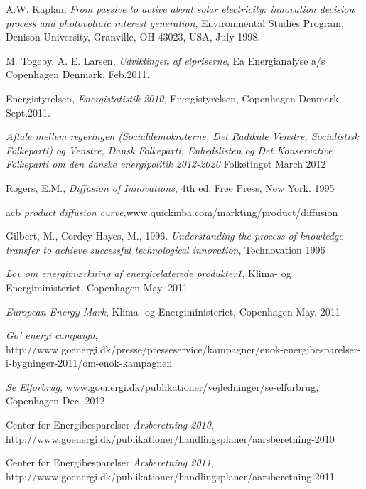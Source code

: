 \documentclass[journal]{IEEEtran}
\begin{document}
\begin{thebibliography}{1}

A.W. Kaplan, \emph{From passive to active about solar electricity: innovation decision
process and photovoltaic interest generation}, \relax Environmental Studies Program, Denison University, Granville, OH 43023, USA, July 1998.

M. Togeby, A. E. Larsen, \emph{Udviklingen af elpriserne}, \relax Ea Energianalyse a/s Copenhagen Denmark, Feb.2011.

Energistyrelsen, \emph{Energistatistik 2010}, \relax Energistyrelsen, Copenhagen Denmark, Sept.2011.

\emph{Aftale mellem regeringen (Socialdemokraterne, Det Radikale Venstre, Socialistisk Folkeparti) og Venstre, Dansk Folkeparti, Enhedslisten og Det Konservative Folkeparti
om den danske energipolitik 2012-2020} \relax Folketinget March 2012

Rogers, E.M., \emph{Diffusion of Innovations}, \relax 4th ed. Free Press, New York. 1995

acb \emph{product diffusion curve},\relax www.quickmba.com/markting/product/diffusion

Gilbert, M., Cordey-Hayes, M., 1996. \emph{Understanding the process of
knowledge transfer to achieve successful technological innovation}, \relax Technovation 1996

\emph{Lov om energimærkning af energirelaterede produkter1}, \relax Klima- og Energiministeriet, Copenhagen May. 2011 

\emph{European Energy Mark}, \relax Klima- og Energiministeriet, Copenhagen May. 2011 

\emph{Go' energi campaign}, \relax http://www.goenergi.dk/presse/presseservice/kampagner/enok-energibesparelser-i-bygninger-2011/om-enok-kampagnen 

\emph{Se Elforbrug}, \relax www.goenergi.dk/publikationer/vejledninger/se-elforbrug, Copenhagen Dec. 2012

Center for Energibesparelser \emph{Årsberetning 2010}, \relax http://www.goenergi.dk/publikationer/handlingsplaner/aarsberetning-2010

Center for Energibesparelser \emph{Årsberetning 2011}, \relax http://www.goenergi.dk/publikationer/handlingsplaner/aarsberetning-2011


\end{thebibliography}
\end{document}
